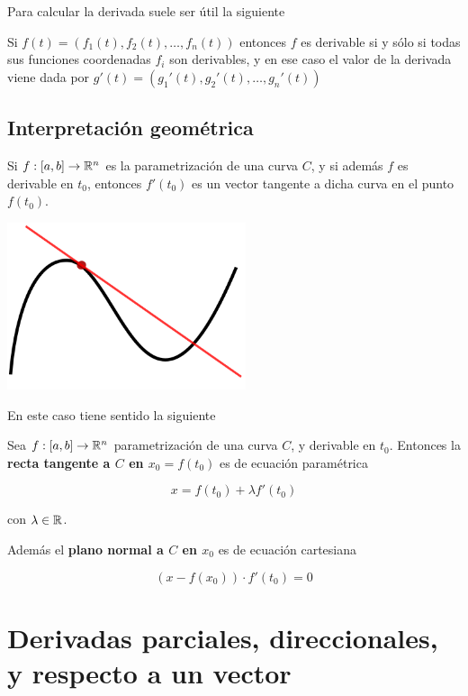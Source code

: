 Para calcular la derivada suele ser útil la siguiente

\begin{observation}
Si $ f(t) = (f_1(t), f_2(t), \ldots, f_n(t))$ entonces $f$ es derivable si y sólo si todas sus funciones coordenadas $ f_i$ son derivables, y en ese caso el valor de la derivada viene dada por $ g'(t) = (g_1'(t), g_2'(t), \ldots, g_n'(t))$
\end{observation}

\subsection{Interpretación geométrica}
Si $f : [a,b] \to \mathbb{R}^n$ es la parametrización de una curva $C$, y si además $f$ es derivable en $t_0$, entonces $f'(t_0)$ es un vector tangente a dicha curva en el punto $f(t_0)$.  

\begin{center}
\includegraphics[width=7cm]{images/04_analisis2/tangent.png}
\end{center}

En este caso tiene sentido la siguiente

\begin{definition}
Sea $f : [a,b] \to \mathbb{R}^n$ parametrización de una curva $C$, y derivable en $t_0$.  Entonces la \textbf{recta tangente a $C$ en $x_0 = f(t_0)$} es de ecuación paramétrica

$$ x = f(t_0) + \lambda f'(t_0) $$

con $\lambda \in \mathbb{R}$.

Además el \textbf{plano normal a $C$ en $x_0$} es de ecuación cartesiana

$$ (x - f(x_0)) \cdot f'(t_0) = 0 $$
\end{definition}

\section{Derivadas parciales, direccionales, y respecto a un vector}

